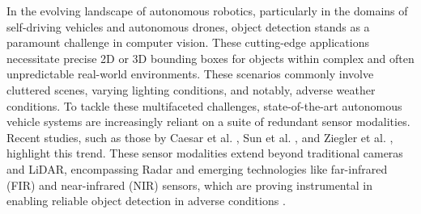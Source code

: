 \documentclass[report.tex]{subfiles}
\begin{document}
            


        
        
        

    In the evolving landscape of autonomous robotics, particularly in the domains of self-driving vehicles and autonomous drones, object detection stands as a paramount challenge in computer vision. These cutting-edge applications necessitate precise 2D or 3D bounding boxes for objects within complex and often unpredictable real-world environments. These scenarios commonly involve cluttered scenes, varying lighting conditions, and notably, adverse weather conditions. To tackle these multifaceted challenges, state-of-the-art autonomous vehicle systems are increasingly reliant on a suite of redundant sensor modalities. Recent studies, such as those by Caesar et al. \cite{caesar2020nuscenes}, Sun et al. \cite{Sun_2020_CVPR}, and Ziegler et al. \cite{ziegler2014making}, highlight this trend. These sensor modalities extend beyond traditional cameras and LiDAR, encompassing Radar and emerging technologies like far-infrared (FIR) and near-infrared (NIR) sensors, which are proving instrumental in enabling reliable object detection in adverse conditions \cite{bijelic2020seeing}.
\end{document}
